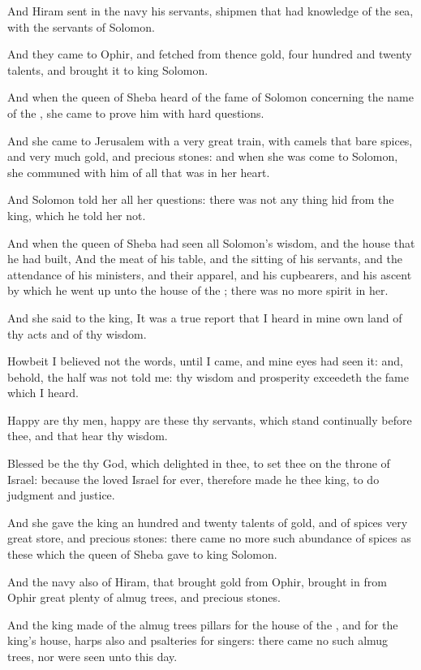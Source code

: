 \Verse And Hiram sent in the navy his servants, shipmen that had knowledge of the sea, with the servants of Solomon.

\Verse And they came to Ophir, and fetched from thence gold, four hundred and twenty talents, and brought it to king Solomon.


\Chapter
\Verse And when the queen of Sheba heard of the fame of Solomon concerning the name of the \LORD, she came to prove him with hard questions.

\Verse And she came to Jerusalem with a very great train, with camels that bare spices, and very much gold, and precious stones: and when she was come to Solomon, she communed with him of all that was in her heart.

\Verse And Solomon told her all her questions: there was not any thing hid from the king, which he told her not.

\Verse And when the queen of Sheba had seen all Solomon's wisdom, and the house that he had built, \Verse And the meat of his table, and the sitting of his servants, and the attendance of his ministers, and their apparel, and his cupbearers, and his ascent by which he went up unto the house of the \LORD; there was no more spirit in her.

\Verse And she said to the king, It was a true report that I heard in mine own land of thy acts and of thy wisdom.

\Verse Howbeit I believed not the words, until I came, and mine eyes had seen it: and, behold, the half was not told me: thy wisdom and prosperity exceedeth the fame which I heard.

\Verse Happy are thy men, happy are these thy servants, which stand continually before thee, and that hear thy wisdom.

\Verse Blessed be the \LORD thy God, which delighted in thee, to set thee on the throne of Israel: because the \LORD loved Israel for ever, therefore made he thee king, to do judgment and justice.

\Verse And she gave the king an hundred and twenty talents of gold, and of spices very great store, and precious stones: there came no more such abundance of spices as these which the queen of Sheba gave to king Solomon.

\Verse And the navy also of Hiram, that brought gold from Ophir, brought in from Ophir great plenty of almug trees, and precious stones.

\Verse And the king made of the almug trees pillars for the house of the \LORD, and for the king's house, harps also and psalteries for singers: there came no such almug trees, nor were seen unto this day.

